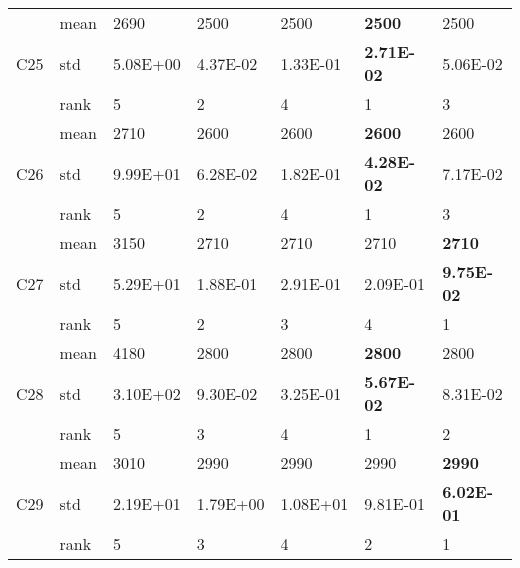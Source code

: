 \begin{table}[]
\begin{tabular}{|l|l|l|l|l|l|l|}
\multirow{3}{*}{C25} & mean & 2690              & 2500              & 2500              & \textbf{2500}     & 2500              \\ \cline{2-7} 
                     & std  & 5.08E+00          & 4.37E-02          & 1.33E-01          & \textbf{2.71E-02} & 5.06E-02          \\ \cline{2-7} 
                     & rank & 5                 & 2                 & 4                 & 1                 & 3                 \\ \hline
\multirow{3}{*}{C26} & mean & 2710              & 2600              & 2600              & \textbf{2600}     & 2600              \\ \cline{2-7} 
                     & std  & 9.99E+01          & 6.28E-02          & 1.82E-01          & \textbf{4.28E-02} & 7.17E-02          \\ \cline{2-7} 
                     & rank & 5                 & 2                 & 4                 & 1                 & 3                 \\ \hline
\multirow{3}{*}{C27} & mean & 3150              & 2710              & 2710              & 2710              & \textbf{2710}     \\ \cline{2-7} 
                     & std  & 5.29E+01          & 1.88E-01          & 2.91E-01          & 2.09E-01          & \textbf{9.75E-02} \\ \cline{2-7} 
                     & rank & 5                 & 2                 & 3                 & 4                 & 1                 \\ \hline
\multirow{3}{*}{C28} & mean & 4180              & 2800              & 2800              & \textbf{2800}     & 2800              \\ \cline{2-7} 
                     & std  & 3.10E+02          & 9.30E-02          & 3.25E-01          & \textbf{5.67E-02} & 8.31E-02          \\ \cline{2-7} 
                     & rank & 5                 & 3                 & 4                 & 1                 & 2                 \\ \hline
\multirow{3}{*}{C29} & mean & 3010              & 2990              & 2990              & 2990              & \textbf{2990}     \\ \cline{2-7} 
                     & std  & 2.19E+01          & 1.79E+00          & 1.08E+01          & 9.81E-01          & \textbf{6.02E-01} \\ \cline{2-7} 
                     & rank & 5                 & 3                 & 4                 & 2                 & 1                 \\ \hline

\end{tabular}
\end{table}
